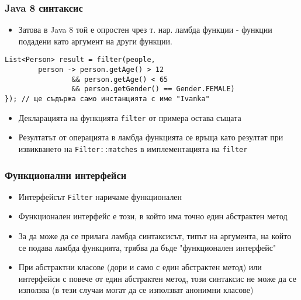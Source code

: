 \documentclass[ignorenonframetext, hyperref=unicode,compress,pdflatex]{beamer}
\begin{document}
\begin{frame}[containsverbatim]\frametitle{Java 8 синтаксис}
\begin{itemize}
  \item Затова в Java 8 той е опростен чрез т. нар. ламбда функции - функции
  подадени като аргумент на други функции.
\end{itemize}
\begin{lstlisting}
List<Person> result = filter(people,
		person -> person.getAge() > 12
				&& person.getAge() < 65
				&& person.getGender() == Gender.FEMALE)
}); // ще съдържа само инстанцията с име "Ivanka"
\end{lstlisting}
\begin{itemize}
  \item Декларацията на функцията \lstinline{filter} от примера остава същата
  \item Резултатът от операцията в ламбда функцията се връща като резултат при
  извикването на \lstinline{Filter::matches} в имплементацията на
  \lstinline{filter}
\end{itemize}
\end{frame}

\begin{frame}[containsverbatim]\frametitle{Функционални интерфейси}
\begin{itemize}
  \item Интерфейсът \lstinline{Filter} наричаме функционален
  \item Функционален интерфейс е този, в който има точно един абстрактен метод
  \item За да може да се прилага ламбда синтаксисът, типът на аргумента, на
  който се подава ламбда функцията, трябва да бъде "функционален интерфейс"
  \item При абстрактни класове (дори и само с един абстрактен метод) или
  интерфейси с повече от един абстрактен метод, този синтаксис не може да се
  използва (в тези случаи могат да се използват анонимни класове)
\end{itemize}
\end{frame}
\end{document}
